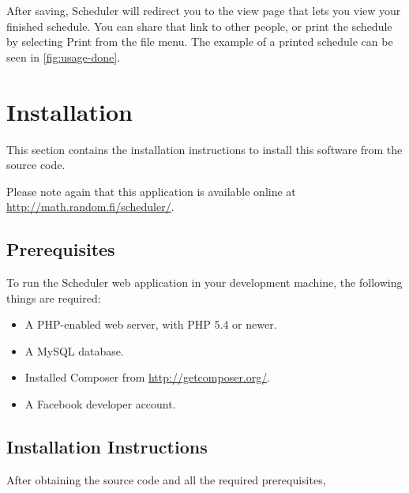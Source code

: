 After saving,
Scheduler will redirect you to the view page
that lets you view your finished schedule.
You can share that link to other people,
or print the schedule by selecting Print from the file menu.
The example of a printed schedule can be seen in \autoref{fig:usage-done}.


\section{Installation}

This section contains the installation instructions
to install this software from the source code.

Please note again that this application is available online
at \url{http://math.random.fi/scheduler/}.


\subsection{Prerequisites}

To run the Scheduler web application in your development machine,
the following things are required:

\begin{itemize}
  \item A PHP-enabled web server, with PHP 5.4 or newer.
  \item A MySQL database.
  \item Installed Composer from \url{http://getcomposer.org/}.
  \item A Facebook developer account.
\end{itemize}



\subsection{Installation Instructions}

After obtaining the source code and all the required prerequisites,

